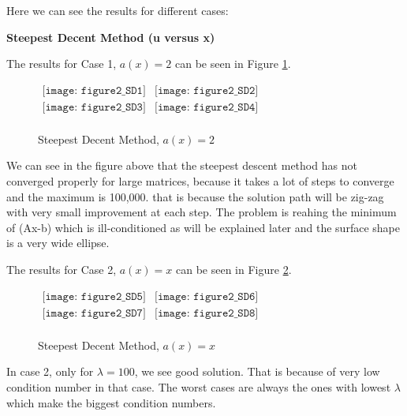 Here we can see the results for different cases:


{\Large \textbf{Steepest Decent Method (u versus x)}}

The results for Case 1, $a(x)=2$ can be seen in Figure \ref{fig:fig2SD1}.

\begin{figure}[H]
    \centering
    $\begin{array}{cc}
        \texttt{[image: figure2\_SD1]} &
        \texttt{[image: figure2\_SD2]} \\
        \texttt{[image: figure2\_SD3]} &
        \texttt{[image: figure2\_SD4]} \\
    \end{array}$
    \caption{Steepest Decent Method, $a(x)=2$}
    \label{fig:fig2SD1}
\end{figure}

We can see in the figure above that the steepest descent method has not converged properly for large matrices, because it takes a lot of steps to converge and the maximum is 100,000. that is because the solution path will be zig-zag with very small improvement at each step. The problem is reahing the minimum of (Ax-b) which is ill-conditioned as will be explained later and the surface shape is a very wide ellipse.

\clearpage
The results for Case 2, $a(x)=x$ can be seen in Figure \ref{fig:fig2SD5}.

\begin{figure}[H]
    \centering
    $\begin{array}{cc}
        \texttt{[image: figure2\_SD5]} &
        \texttt{[image: figure2\_SD6]} \\
        \texttt{[image: figure2\_SD7]} &
        \texttt{[image: figure2\_SD8]} \\
    \end{array}$
    \caption{Steepest Decent Method, $a(x)=x$}
    \label{fig:fig2SD5}
\end{figure}

In case 2, only for $\lambda=100$, we see good solution. That is because of very low condition number in that case. The worst cases are always the ones with lowest $\lambda$ which make the biggest condition numbers.

